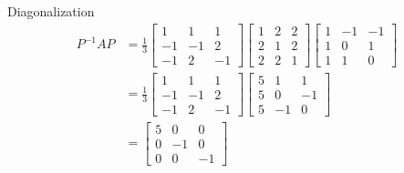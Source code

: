 \documentclass[handout]{beamer}
\begin{document}
        \begin{frame}{Diagonalization}
                \begin{align*}
                        P^{-1}AP &= \frac{1}{3} \begin{bmatrix}
                                1 & 1 & 1 \\ -1 & -1 & 2 \\ -1 & 2 & -1
                        \end{bmatrix}
                        \begin{bmatrix}
                                1 & 2 & 2 \\ 2 & 1 & 2 \\ 2 & 2 & 1
                        \end{bmatrix}
                        \begin{bmatrix}
                                1 & -1 & -1 \\ 1 & 0 & 1 \\ 1 & 1 & 0
                        \end{bmatrix} \\
                        &= \frac{1}{3} \begin{bmatrix}
                                1 & 1 & 1 \\ -1 & -1 & 2 \\ -1 & 2 & -1
                        \end{bmatrix}
                        \begin{bmatrix}
                                5 & 1 & 1 \\ 5 & 0 & -1 \\ 5 & -1 & 0
                        \end{bmatrix} \\
                        &= \begin{bmatrix}
                                5 & 0 & 0 \\ 0 & -1 & 0 \\ 0 & 0 & -1
                        \end{bmatrix}
                \end{align*}
        \end{frame}
\end{document}
